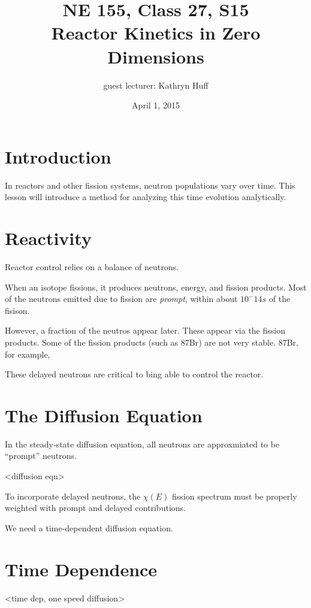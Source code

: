 \documentclass[12pt]{article}
\title{NE 155, Class 27, S15 \\
Reactor Kinetics in Zero Dimensions}
\date{April 1, 2015}
\begin{document}
\author{guest lecturer: Kathryn Huff}
\maketitle

\hrulefill

\section{Introduction}

In reactors and other fission systems, neutron populations vary over time. This 
lesson will introduce a method for analyzing this time evolution analytically.


\section{Reactivity}

Reactor control relies on a balance of neutrons.

When an isotope fissions, it produces neutrons, energy, and fission products. 
Most of the neutrons emitted due to fission are \emph{prompt}, within about 
$10^-{14}s$ of the fisison. 

However, a fraction of the neutros appear later. These appear via the fission 
products. Some of the fission products (such as 87Br) are not very stable. 
87Br, for example, 

These delayed neutrons are critical to bing able to control the reactor.

\section{The Diffusion Equation}
In the steady-state diffusion equation, all neutrons are approxmiated to be ``prompt'' neutrons.

<diffusion eqn>

To incorporate delayed neutrons, the $\chi (E)$ fission spectrum must be properly weighted with prompt and delayed contributions.

We need a time-dependent diffusion equation.

\section{Time Dependence}

<time dep, one speed diffusion>
\end{document}
